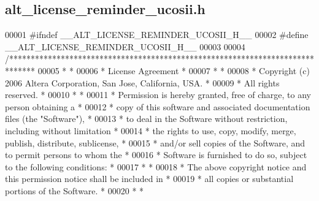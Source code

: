 \subsection{alt\+\_\+license\+\_\+reminder\+\_\+ucosii.\+h}
\label{alt__license__reminder__ucosii_8h_source}

\begin{DoxyCode}
00001 \textcolor{preprocessor}{#ifndef \_\_ALT\_LICENSE\_REMINDER\_UCOSII\_H\_\_}
00002 \textcolor{preprocessor}{#define \_\_ALT\_LICENSE\_REMINDER\_UCOSII\_H\_\_}
00003 
00004 \textcolor{comment}{/******************************************************************************}
00005 \textcolor{comment}{*                                                                             *}
00006 \textcolor{comment}{* License Agreement                                                           *}
00007 \textcolor{comment}{*                                                                             *}
00008 \textcolor{comment}{* Copyright (c) 2006 Altera Corporation, San Jose, California, USA.           *}
00009 \textcolor{comment}{* All rights reserved.                                                        *}
00010 \textcolor{comment}{*                                                                             *}
00011 \textcolor{comment}{* Permission is hereby granted, free of charge, to any person obtaining a     *}
00012 \textcolor{comment}{* copy of this software and associated documentation files (the "Software"),  *}
00013 \textcolor{comment}{* to deal in the Software without restriction, including without limitation   *}
00014 \textcolor{comment}{* the rights to use, copy, modify, merge, publish, distribute, sublicense,    *}
00015 \textcolor{comment}{* and/or sell copies of the Software, and to permit persons to whom the       *}
00016 \textcolor{comment}{* Software is furnished to do so, subject to the following conditions:        *}
00017 \textcolor{comment}{*                                                                             *}
00018 \textcolor{comment}{* The above copyright notice and this permission notice shall be included in  *}
00019 \textcolor{comment}{* all copies or substantial portions of the Software.                         *}
00020 \textcolor{comment}{*                                                                             *}

\end{DoxyCode}
